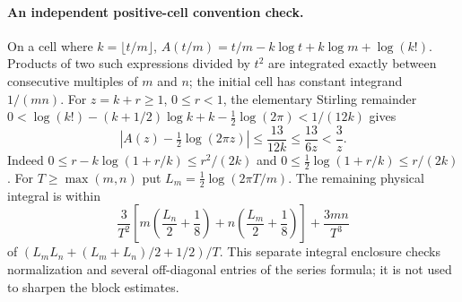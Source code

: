 \paragraph{An independent positive-cell convention check.}
On a cell where $k=\lfloor t/m\rfloor$,
$A(t/m)=t/m-k\log t+k\log m+\log(k!)$.
Products of two such expressions divided by $t^2$ are integrated
exactly between consecutive multiples of $m$ and $n$; the initial
cell has constant integrand $1/(mn)$.
For $z=k+r\geq1$, $0\leq r<1$, the elementary Stirling remainder
\cite[\S5.11]{DLMFGammaBounds}
$0<\log(k!)-(k+1/2)\log k+k-\tfrac12\log(2\pi)<1/(12k)$
gives
\[
 \left|A(z)-\tfrac12\log(2\pi z)\right|
 \leq\frac{13}{12k}\leq\frac{13}{6z}<\frac3z.
\]
Indeed $0\leq r-k\log(1+r/k)\leq r^2/(2k)$ and
$0\leq\tfrac12\log(1+r/k)\leq r/(2k)$.
For $T\geq\max(m,n)$ put $L_m=\tfrac12\log(2\pi T/m)$.
The remaining physical integral is within
\[
 \frac3{T^2}\left[m\left(\frac{L_n}2+\frac18\right)
                 +n\left(\frac{L_m}2+\frac18\right)\right]
            +\frac{3mn}{T^3}
\]
of $(L_mL_n+(L_m+L_n)/2+1/2)/T$.
This separate integral enclosure checks normalization and several
off-diagonal entries of the series formula; it is not used to sharpen
the block estimates.
